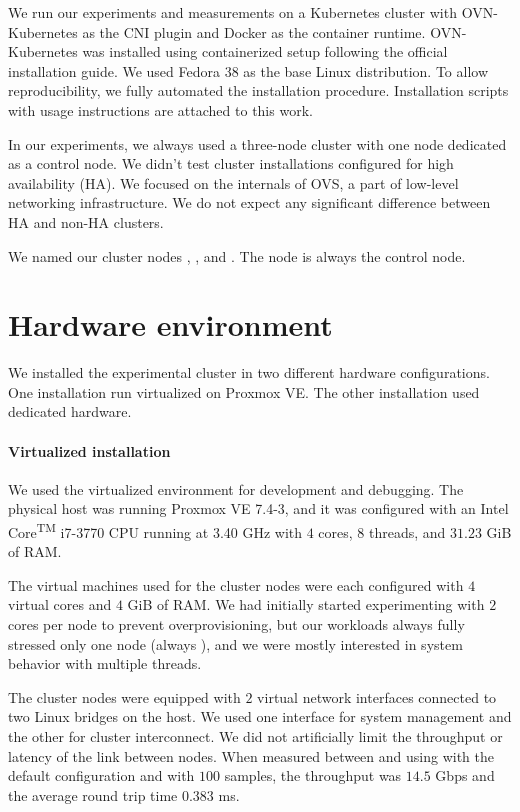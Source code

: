 We run our experiments and measurements on a Kubernetes cluster with OVN-Kubernetes as the CNI plugin and Docker as the container runtime. OVN-Kubernetes was installed using containerized setup following the official installation guide. We used Fedora 38 as the base Linux distribution. To allow reproducibility, we fully automated the installation procedure. Installation scripts with usage instructions are attached to this work.

In our experiments, we always used a three-node cluster with one node dedicated as a control node. We didn't test cluster installations configured for high availability (HA). We focused on the internals of OVS, a part of low-level networking infrastructure. We do not expect any significant difference between HA and non-HA clusters.

We named our cluster nodes , , and . The node  is always the control node.

\section{Hardware environment}
\label{sec:hw-env}

We installed the experimental cluster in two different hardware configurations. One installation run virtualized on Proxmox VE. The other installation used dedicated hardware.

\paragraph{Virtualized installation}
We used the virtualized environment for development and debugging. The physical host was running Proxmox VE 7.4-3, and it was configured with an Intel\textsuperscript{\textregistered} Core\textsuperscript{TM} i7-3770 CPU running at 3.40 GHz with $4$ cores, $8$ threads, and $31.23$ GiB of RAM.

The virtual machines used for the cluster nodes were each configured with $4$ virtual cores and $4$ GiB of RAM. We had initially started experimenting with $2$ cores per node to prevent overprovisioning, but our workloads always fully stressed only one node (always ), and we were mostly interested in system behavior with multiple threads.

The cluster nodes were equipped with $2$ virtual network interfaces connected to two Linux bridges on the host. We used one interface for system management and the other for cluster interconnect. We did not artificially limit the throughput or latency of the link between nodes. When measured between  and  using  with the default configuration and  with $100$ samples, the throughput was $14.5$ Gbps and the average round trip time $0.383$ ms.

